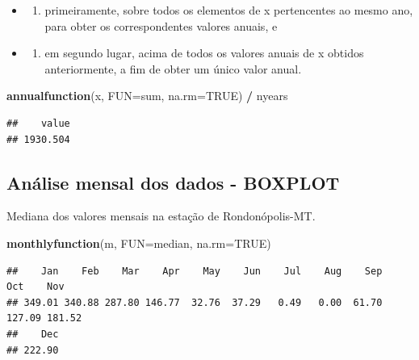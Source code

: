 \documentclass[
]{book}
\newenvironment{Shaded}{\begin{snugshade}}{\end{snugshade}}
\newcommand{\DataTypeTok}[1]{\textcolor[rgb]{0.13,0.29,0.53}{#1}}
\newcommand{\KeywordTok}[1]{\textcolor[rgb]{0.13,0.29,0.53}{\textbf{#1}}}
\newcommand{\NormalTok}[1]{#1}
\newcommand{\OperatorTok}[1]{\textcolor[rgb]{0.81,0.36,0.00}{\textbf{#1}}}
\newcommand{\OtherTok}[1]{\textcolor[rgb]{0.56,0.35,0.01}{#1}}
\newcommand{\StringTok}[1]{\textcolor[rgb]{0.31,0.60,0.02}{#1}}
\providecommand{\tightlist}{%
  \setlength{\itemsep}{0pt}\setlength{\parskip}{0pt}}
\begin{document}
\begin{itemize}
\item
  \begin{enumerate}
  \def\labelenumi{(\roman{enumi})}
  \tightlist
  \item
    primeiramente, sobre todos os elementos de x pertencentes ao mesmo ano, para obter os correspondentes valores anuais, e
  \end{enumerate}
\item
  \begin{enumerate}
  \def\labelenumi{(\roman{enumi})}
  \setcounter{enumi}{1}
  \tightlist
  \item
    em segundo lugar, acima de todos os valores anuais de x obtidos anteriormente, a fim de obter um único valor anual.
  \end{enumerate}
\end{itemize}

\begin{Shaded}
\begin{Highlighting}[]
\KeywordTok{annualfunction}\NormalTok{(x, }\DataTypeTok{FUN=}\NormalTok{sum, }\DataTypeTok{na.rm=}\OtherTok{TRUE}\NormalTok{) }\OperatorTok{/}\StringTok{ }\NormalTok{nyears}
\end{Highlighting}
\end{Shaded}

\begin{verbatim}
##    value 
## 1930.504
\end{verbatim}

\hypertarget{anuxe1lise-mensal-dos-dados---boxplot}{%
\subsection{Análise mensal dos dados - BOXPLOT}\label{anuxe1lise-mensal-dos-dados---boxplot}}

Mediana dos valores mensais na estação de Rondonópolis-MT.

\begin{Shaded}
\begin{Highlighting}[]
\KeywordTok{monthlyfunction}\NormalTok{(m, }\DataTypeTok{FUN=}\NormalTok{median, }\DataTypeTok{na.rm=}\OtherTok{TRUE}\NormalTok{)}
\end{Highlighting}
\end{Shaded}

\begin{verbatim}
##    Jan    Feb    Mar    Apr    May    Jun    Jul    Aug    Sep    Oct    Nov 
## 349.01 340.88 287.80 146.77  32.76  37.29   0.49   0.00  61.70 127.09 181.52 
##    Dec 
## 222.90
\end{verbatim}
\end{document}
